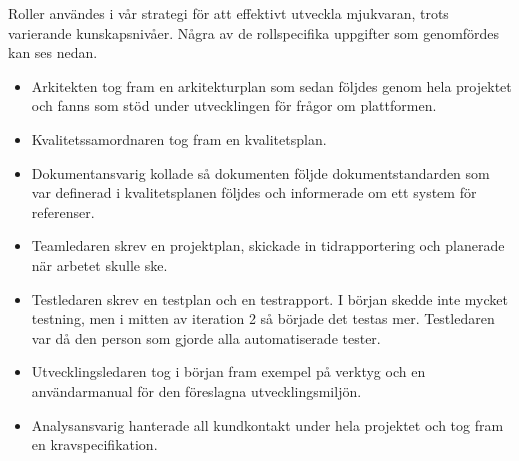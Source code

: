 Roller användes i vår strategi för att effektivt utveckla mjukvaran, trots varierande kunskapsnivåer. Några av de rollspecifika uppgifter som genomfördes kan ses nedan.
\begin{itemize}
\item Arkitekten tog fram en arkitekturplan som sedan följdes genom hela projektet och fanns som stöd under utvecklingen för frågor om plattformen.
\item Kvalitetssamordnaren tog fram en kvalitetsplan.
\item Dokumentansvarig kollade så dokumenten följde dokumentstandarden som var definerad i kvalitetsplanen följdes och informerade om ett system för referenser.
\item Teamledaren skrev en projektplan, skickade in tidrapportering och planerade när arbetet skulle ske.
\item Testledaren skrev en testplan och en testrapport. I början skedde inte mycket testning, men i mitten av iteration 2 så började det testas mer. Testledaren var då den person som gjorde alla automatiserade tester.
\item Utvecklingsledaren tog i början fram exempel på verktyg och en användarmanual för den föreslagna utvecklingsmiljön.  
\item Analysansvarig hanterade all kundkontakt under hela projektet och tog fram en kravspecifikation. 
\end{itemize}   

